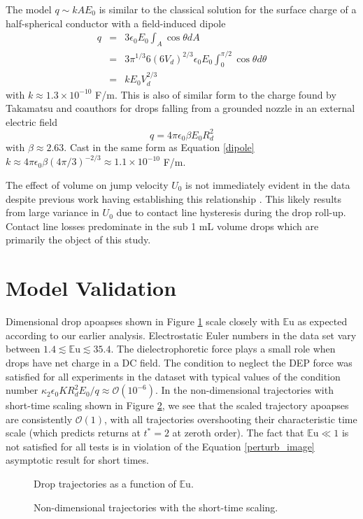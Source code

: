 \documentclass[12pt,a4paper,oneside]{book}
\begin{document}
The model $q \sim kAE_0$ is similar to the classical solution for the surface charge of a half-spherical conductor with a field-induced dipole \cite{david_j._griffiths_introduction_1999}
\begin{eqnarray}
q &=& 3 \epsilon_0 E_0 \int_A \cos \theta dA \nonumber \\
&=& 3 \pi^{1/3} 6 \left(6 V_d \right)^{2/3} \epsilon_0 E_0 \int^{\pi / 2}_{0} \!\!\!\!\! \cos \theta d\theta \nonumber \\
&=& k E_0 V_d^{2/3} \label{dipole}
\end{eqnarray}
with $k \approx 1.3 \times 10^{-10}$ F/m. This is also of similar form to the charge found by Takamatsu and coauthors for drops falling from a grounded nozzle in an external electric field \cite{takamatsu_theoretical_1981}
\[q = 4 \pi \epsilon_0 \beta E_0 R_d^2 \]
with $\beta \approx 2.63$. Cast in the same form as Equation \ref{dipole} $k \approx 4 \pi \epsilon_0 \beta (4 \pi/3)^{-2/3} \approx 1.1 \times 10^{-10}$ F/m.

The effect of volume on jump velocity $U_0$ is not immediately evident in the data despite previous work having establishing this relationship \cite{attari_puddle_2016}. This likely results from large variance in $U_0$ due to contact line hysteresis during the drop roll-up. Contact line losses predominate in the sub 1 mL volume drops which are primarily the object of this study.  

\section{Model Validation}
Dimensional drop apoapses shown in Figure \ref{fig:series_s_eu} scale closely with $\mathbb{E}\mbox{u}$ as expected according to our earlier analysis. Electrostatic Euler numbers in the data set vary between $1.4 \lesssim \mathbb{E}\mbox{u} \lesssim 35.4$. The dielectrophoretic force plays a small role when drops have net charge in a DC field. The condition to neglect the DEP force was satisfied for all experiments in the dataset with typical values of the condition number $\kappa_2 \epsilon_0 K R_d^2 E_0/q \approx \mathcal{O}(10^{-6})$. In the non-dimensional trajectories with short-time scaling shown in Figure \ref{fig:series_s_ds}, we see that the scaled trajectory apoapses are consistently $\mathcal{O}(1)$, with all trajectories overshooting their characteristic time scale (which predicts returns at $t^*  =2$ at zeroth order). The fact that $\mathbb{E}\mbox{u} \ll 1$ is not satisfied for all tests is in violation of the Equation \ref{perturb_image} asymptotic result for short times.
\begin{figure}[!htb]
    \centering
    
    \caption{Drop trajectories as a function of $\mathbb{E}\mbox{u}$.\label{fig:series_s_eu}}
\end{figure}
\begin{figure}[htb]
    \centering
    
    \caption{Non-dimensional trajectories with the short-time scaling.\label{fig:series_s_ds}}
\end{figure}
\end{document}
